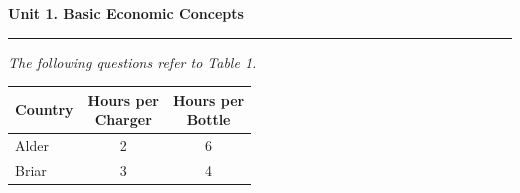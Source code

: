 \documentclass[10pt]{article}
\newenvironment{stimulus}
  {\begin{center}\begin{minipage}{0.96\columnwidth}\footnotesize\itshape\setlength{\tabcolsep}{3pt}\renewcommand{\arraystretch}{0.96}}
  {\end{minipage}\end{center}}
\newcommand{\unitheader}[2]{%
  \vspace{0.35em}
  {\large\bfseries Unit #1. #2\par}
  \vspace{0.2em}
  \hrule
  \vspace{0.45em}
}
\begin{document}
\vspace{0.8em}
\begin{multicols*}{2}
\unitheader{1}{Basic Economic Concepts}
\begin{stimulus}
The following questions refer to Table 1.

\begin{center}
\begin{tabular}{lcc}
\toprule
Country & \shortstack{Hours per\\ Charger} & \shortstack{Hours per\\ Bottle} \\
\midrule
Alder & 2 & 6 \\
Briar & 3 & 4 \\
\bottomrule
\end{tabular}
\end{center}


\end{stimulus}
\end{multicols*}
\end{document}
